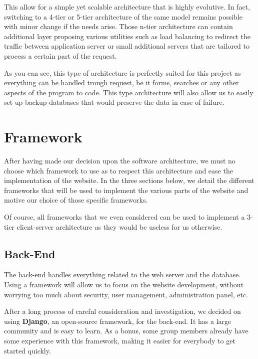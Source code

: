 This allow for a simple yet scalable architecture that is highly evolutive. In fact, switching to a 4-tier or 5-tier architecture of the same model remains possible with minor change if the needs arise. Those n-tier architecture can contain additional layer proposing various utilities such as load balancing to redirect the traffic between application server or small additional servers that are tailored to process a certain part of the request. \newline

As you can see, this type of architecture is perfectly suited for this project as everything can be handled trough request, be it forms, searches or any other aspects of the program to code. This type architecture will also allow us to easily set up backup databases that would preserve the data in case of failure. 

\section{Framework}

After having made our decision upon the software architecture, we must no choose which framework to use as to respect this architecture and ease the implementation of the website. In the three sections below, we detail the different frameworks that will be used to implement the various parts of the website and motive our choice of those specific frameworks. \newline

Of course, all frameworks that we even considered can be used to implement a 3-tier client-server architecture as they would be useless for us otherwise.

\subsection{Back-End}
The back-end handles everything related to the web server and the database. Using a framework will allow us to focus on the website development, without worrying too much about security, user management, administration panel, etc.\newline

After a long process of careful consideration and investigation, we decided on using \textbf{Django}, an open-source framework, for the back-end. It has a large community and is easy to learn. As a bonus, some group members already have some experience with this framework, making it easier for everybody to get started quickly.\newline

